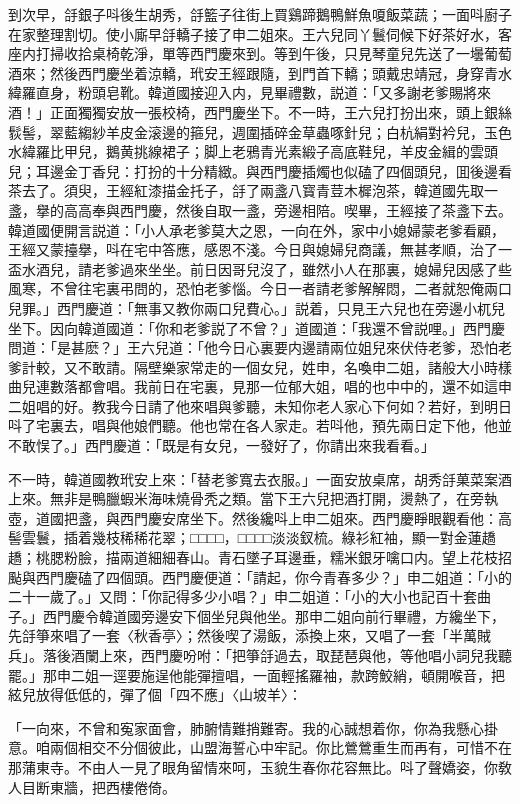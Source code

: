 到次早，㧱銀子呌後生胡秀，㧱籃子往街上買鷄蹄鵝鴨鮮魚嗄飯菜蔬；一面呌廚子在家整理割切。使小廝早㧱轎子接了申二姐來。王六兒同丫鬟伺候下好茶好水，客座内打掃收拾桌椅乾淨，單等西門慶來到。等到午後，只見琴童兒先送了一壜葡萄酒來；然後西門慶坐着涼轎，玳安王經跟隨，到門首下轎；頭戴忠靖冠，身穿青水緯羅直身，粉頭皂靴。韓道國接迎入内，見畢禮數，説道：「又多謝老爹賜將來酒！」正面獨獨安放一張校椅，西門慶坐下。不一時，王六兒打扮出來，頭上銀絲䯼髻，翠藍縐紗羊皮金滚邊的箍兒，週圍插碎金草蟲啄針兒；白杭絹對衿兒，玉色水緯羅比甲兒，鵝黄挑線裙子；脚上老鴉青光素緞子高底鞋兒，羊皮金緝的雲頭兒；耳邊金丁香兒：打扮的十分精緻。與西門慶插燭也似磕了四個頭兒，囬後邊看茶去了。須臾，王經紅漆描金托子，㧱了兩盞八寳青荳木樨泡茶，韓道國先取一盞，擧的高高奉與西門慶，然後自取一盞，旁邊相陪。喫畢，王經接了茶盞下去。韓道國便開言説道：「小人承老爹莫大之恩，一向在外，家中小媳婦蒙老爹看顧，王經又蒙擡擧，呌在宅中答應，感恩不淺。今日與媳婦兒商議，無甚孝順，治了一盃水酒兒，請老爹過來坐坐。前日因哥兒沒了，雖然小人在那裏，媳婦兒因感了些風寒，不曾往宅裏弔問的，恐怕老爹惱。今日一者請老爹解解悶，二者就恕俺兩口兒罪。」西門慶道：「無事又教你兩口兒費心。」説着，只見王六兒也在旁邊小杌兒坐下。因向韓道國道：「你和老爹説了不曾？」道國道：「我還不曾説哩。」西門慶問道：「是甚麽？」王六兒道：「他今日心裏要内邊請兩位姐兒來伏侍老爹，恐怕老爹計較，又不敢請。隔壁樂家常走的一個女兒，姓申，名喚申二姐，諸般大小時樣曲兒連數落都會唱。我前日在宅裏，見那一位郁大姐，唱的也中中的，還不如這申二姐唱的好。教我今日請了他來唱與爹聽，未知你老人家心下何如？若好，到明日呌了宅裏去，唱與他娘們聽。他也常在各人家走。若呌他，預先兩日定下他，他並不敢悮了。」西門慶道：「既是有女兒，一發好了，你請出來我看看。」

不一時，韓道國教玳安上來：「替老爹寬去衣服。」一面安放桌席，胡秀㧱菓菜案酒上來。無非是鴨臘蝦米海味燒骨秃之類。當下王六兒把酒打開，燙熱了，在旁執壺，道國把盞，與西門慶安席坐下。然後纔呌上申二姐來。西門慶睜眼觀看他：高髻雲鬟，插着幾枝稀稀花翠；□□□□，□□□□淡淡釵梳。綠衫紅袖，顯一對金蓮趫趫；桃腮粉臉，描兩道細細春山。青石墜子耳邊垂，糯米銀牙噙口内。望上花枝招颭與西門慶磕了四個頭。西門慶便道：「請起，你今青春多少？」申二姐道：「小的二十一歲了。」又問：「你記得多少小唱？」申二姐道：「小的大小也記百十套曲子。」西門慶令韓道國旁邊安下個坐兒與他坐。那申二姐向前行畢禮，方纔坐下，先㧱箏來唱了一套〈秋香亭〉；然後喫了湯飯，添換上來，又唱了一套「半萬賊兵」。落後酒闌上來，西門慶吩咐：「把箏㧱過去，取琵琶與他，等他唱小詞兒我聽罷。」那申二姐一逕要施逞他能彈擅唱，一面輕搖羅袖，款跨鮫綃，頓開喉音，把絃兒放得低低的，彈了個「四不應」〈山坡羊〉：

「一向來，不曾和寃家面會，肺腑情難捎難寄。我的心誠想着你，你為我懸心掛意。咱兩個相交不分個彼此，山盟海誓心中牢記。你比鶯鶯重生而再有，可惜不在那蒲東寺。不由人一見了眼角留情來呵，玉貌生春你花容無比。呌了聲嬌姿，你敎人目断東牆，把西樓倦倚。

